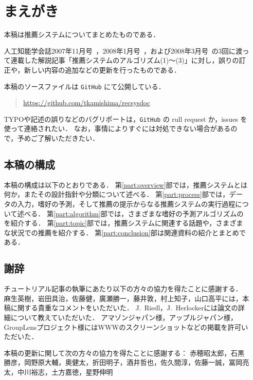 \chapter*{まえがき}
\label{chap:preface}

本稿は推薦システムについてまとめたものである．

人工知能学会誌2007年11月号~\cite{jpublist:076}，2008年1月号~\cite{jpublist:081}，および2008年3月号~\cite{jpublist:083}の3回に渡って連載した解説記事「推薦システムのアルゴリズム(1)〜(3)」に対し，誤りの訂正や，新しい内容の追加などの更新を行ったものである．

本稿のソースファイルは \texttt{GitHub} にて公開している．
\begin{quote}
\url{https://github.com/tkamishima/recsysdoc}
\end{quote}
TYPOや記述の誤りなどのバグリポートは，\texttt{GitHub} の rull request か，issues を使って連絡されたい．
なお，事情によりすぐには対処できない場合があるので，予めご了解いただきたい．

\section*{本稿の構成}
\label{sec:preface:organization}

本稿の構成は以下のとおりである．
第\ref{part:overview}部では，推薦システムとは何か，またその設計指針や分類について述べる．
第\ref{part:process}部では，データの入力，嗜好の予測，そして推薦の提示からなる推薦システムの実行過程について述べる．
第\ref{part:algorithm}部では，さまざまな嗜好の予測アルゴリズムのを紹介する．
第\ref{part:topic}部では，推薦システムに関連する話題や，さまざまな状況での推薦を紹介する．
第\ref{part:conclusion}部は関連資料の紹介とまとめである．

\section*{謝辞}
\label{sec:preface:ack}

チュートリアル記事の執筆にあたり以下の方々の協力を得たことに感謝する．
麻生英樹，岩田具治，佐藤健，廣瀬勝一，藤井敦，村上知子，山口高平には，本稿に関する貴重なコメントをいただいた．
J.~Riedl，J.~Herlockerには論文の詳細について教えていただいた．
アマゾンジャパン様，アップルジャパン様，GroupLensプロジェクト様にはWWWのスクリーンショットなどの掲載を許可いただいた．

本稿の更新に関して次の方々の協力を得たことに感謝する：
赤穂昭太郎，石黒勝彦，岡野原大輔，奧健太，折田明子，酒井哲也，佐久間淳，佐藤一誠，冨岡亮太，中川裕志，土方嘉徳，星野伸明
